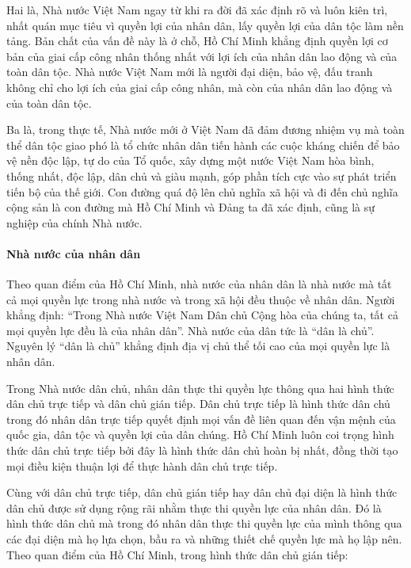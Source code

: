 Hai là, Nhà nước Việt Nam ngay từ khi ra đời đã xác định rõ và luôn kiên trì, nhất quán mục tiêu vì quyền lợi của nhân dân, lấy quyền lợi của dân tộc làm nền tảng. Bản chất của vấn đề này là ở chỗ, Hồ Chí Minh khẳng định quyền lợi cơ bản của giai cấp công nhân thống nhất với lợi ích của nhân dân lao động và của toàn dân tộc. Nhà nước Việt Nam mới là người đại diện, bảo vệ, đấu tranh không chỉ cho lợi ích của giai cấp công nhân, mà còn của nhân dân lao động và của toàn dân tộc.

Ba là, trong thực tế, Nhà nước mới ở Việt Nam đã đảm đương nhiệm vụ mà toàn thể dân tộc giao phó là tổ chức nhân dân tiến hành các cuộc kháng chiến để bảo vệ nền độc lập, tự do của Tổ quốc, xây dựng một nước Việt Nam hòa bình, thống nhất, độc lập, dân chủ và giàu mạnh, góp phần tích cực vào sự phát triển tiến bộ của thế giới. Con đường quá độ lên chủ nghĩa xã hội và đi đến chủ nghĩa cộng sản là con đường mà Hồ Chí Minh và Đảng ta đã xác định, cũng là sự nghiệp của chính Nhà nước.

\paragraph{Nhà nước của nhân dân}
Theo quan điểm của Hồ Chí Minh, nhà nước của nhân dân là nhà nước mà tất cả mọi quyền lực trong nhà nước và trong xã hội đều thuộc về nhân dân. Người khẳng định: ``Trong Nhà nước Việt Nam Dân chủ Cộng hòa của chúng ta, tất cả mọi quyền lực đều là của nhân dân''. Nhà nước của dân tức là ``dân là chủ''. Nguyên lý ``dân là chủ'' khẳng định địa vị chủ thể tối cao của mọi quyền lực là nhân dân.

Trong Nhà nước dân chủ, nhân dân thực thi quyền lực thông qua hai hình thức dân chủ trực tiếp và dân chủ gián tiếp. Dân chủ trực tiếp là hình thức dân chủ trong đó nhân dân trực tiếp quyết định mọi vấn đề liên quan đến vận mệnh của quốc gia, dân tộc và quyền lợi của dân chúng. Hồ Chí Minh luôn coi trọng hình thức dân chủ trực tiếp bởi đây là hình thức dân chủ hoàn bị nhất, đồng thời tạo mọi điều kiện thuận lợi để thực hành dân chủ trực tiếp.

Cùng với dân chủ trực tiếp, dân chủ gián tiếp hay dân chủ đại diện là hình thức dân chủ được sử dụng rộng rãi nhằm thực thi quyền lực của nhân dân. Đó là hình thức dân chủ mà trong đó nhân dân thực thi quyền lực của mình thông qua các đại diện mà họ lựa chọn, bầu ra và những thiết chế quyền lực mà họ lập nên. Theo quan điểm của Hồ Chí Minh, trong hình thức dân chủ gián tiếp:

